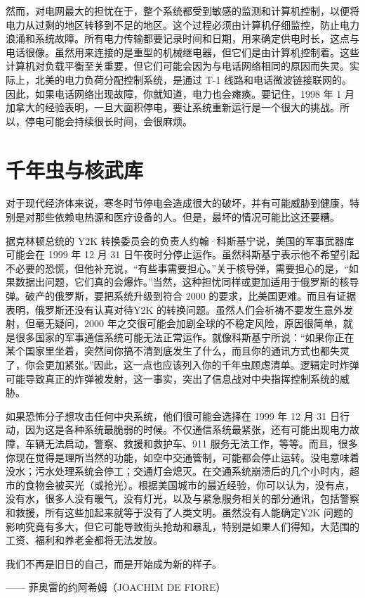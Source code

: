 然而，对电网最大的担忧在于，整个系统都受到敏感的监测和计算机控制，以便将电力从过剩的地区转移到不足的地区。这个过程必须由计算机仔细监控，防止电力浪涌和系统故障。所有电力传输都要记录时间和日期，用来确定供电时长，这点与电话很像。虽然用来连接的是重型的机械继电器，但它们是由计算机控制着。这些计算机对负载平衡至关重要，但它们可能会因为与电话网络相同的原因而失灵。实际上，北美的电力负荷分配控制系统，是通过 T-1 线路和电话微波链接联网的。因此，如果电话网络出现故障，你就知道，电力也会瘫痪。要记住，1998 年 1 月加拿大的经验表明，一旦大面积停电，要让系统重新运行是一个很大的挑战。所以，停电可能会持续很长时间，会很麻烦。


\section{千年虫与核武库}
对于现代经济体来说，寒冬时节停电会造成很大的破坏，并有可能威胁到健康，特别是对那些依赖电热源和医疗设备的人。但是，最坏的情况可能比这还要糟。


据克林顿总统的 Y2K 转换委员会的负责人约翰·科斯基宁说，美国的军事武器库可能会在 1999 年 12 月 31 日午夜时分停止运作。虽然科斯基宁表示他不希望引起不必要的恐慌，但他补充说，“有些事需要担心。”关于核导弹，需要担心的是，“如果数据出问题，它们真的会爆炸。”当然，这种担忧同样或更加适用于俄罗斯的核导弹。破产的俄罗斯，要把系统升级到符合 2000 的要求，比美国更难。而且有证据表明，俄罗斯还没有认真对待Y2K 的转换问题。虽然人们会祈祷不要发生意外发射，但毫无疑问，2000 年之交很可能会加剧全球的不稳定风险，原因很简单，就是很多国家的军事通信系统可能无法正常运作。就像科斯基宁所说：“如果你正在某个国家里坐着，突然间你搞不清到底发生了什么，而且你的通讯方式也都失灵了，你会更加紧张。”因此，这一点也应该列入你的千年虫顾虑清单。逻辑定时炸弹可能导致真正的炸弹被发射，这一事实，突出了信息战对中央指挥控制系统的威胁。


如果恐怖分子想攻击任何中央系统，他们很可能会选择在 1999 年 12 月 31 日行动，因为这是各种系统最脆弱的时候。不仅通信系统最紧张，还有可能出现电力故障，车辆无法启动，警察、救援和救护车、911 服务无法工作，等等。而且，很多你现在觉得是理所当然的功能，如空中交通管制，可能都会停止运转。没电意味着没水；污水处理系统会停工；交通灯会熄灭。在交通系统崩溃后的几个小时内，超市的食物会被买光（或抢光）。根据美国城市的最近经验，你可以认为，没有点，没有水，很多人没有暖气，没有灯光，以及与紧急服务相关的部分通讯，包括警察和救援，所有这些加起来就等于没有了人类文明。虽然没有人能确定Y2K 问题的影响究竟有多大，但它可能导致街头抢劫和暴乱，特别是如果人们得知，大范围的工资、福利和养老金都将无法发放。


\begin{tcolorbox}
我们不再是旧日的自己，而是开始成为新的样子。
\begin{flushright}
—— 菲奥雷的约阿希姆（JOACHIM DE FIORE）
\end{flushright}
\end{tcolorbox}



